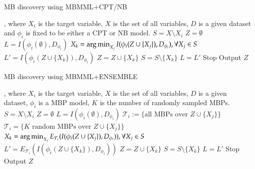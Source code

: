\begin{algorithm}[]
\caption{MB discovery using MBMML+CPT/NB}
\label{alg:mbmmlf}
\begin{algorithmic}[MBMML]
, where $X_i$ is the target variable, $X$ is the set of all variables, $D$ is a given dataset and $\phi_i$ is fixed to be either a CPT or  NB model.
    \State $S = X \setminus {X_i}$ 
    \State $Z = \emptyset$ 
    \State $L = I(\phi_i(\emptyset), D_{\phi_i})$  
    		\State $X_k = \operatorname*{arg\,min}_{X_j} I(\phi_i(Z \cup \{X_j\}), D_{\phi_i}), \forall X_j \in S$ 
    		\State $L' = I(\phi_i(Z \cup \{X_k\}), D_{\phi_i})$ 
    		 
    			\State $Z = Z \cup \{X_k\}$
    			\State $S = S \setminus \{X_k\}$
    			\State $L = L'$ 
    		\Else
    			\State Stop 
			\EndIf
	\EndWhile
	\State Output $Z$
\EndProcedure
\end{algorithmic}
\end{algorithm}

\begin{algorithm}[]
\caption{MB discovery using MBMML+ENSEMBLE}
\label{alg:mbmmlr}
\begin{algorithmic}[MBMML]
, where $X_i$ is the target variable, $X$ is the set of all variables, $D$ is a given dataset, $\phi_i$ is a MBP model, $K$ is the number of randomly sampled MBPs. 
    \State $S = X \setminus {X_i}$ 
    \State $Z = \emptyset$ 
    \State $L = I(\phi_i(\emptyset), D_{\phi_i})$  
    		 
    			\State $\mathcal{T}_i := \{\text{all MBPs over } Z \cup \{X_j\}\}$ 
    		\Else
    			\State $\mathcal{T}_i =  \{K \text{ random MBPs over } Z \cup \{X_j\}\}$ 
    		\EndIf 
    		\State $X_k = \operatorname*{arg\,min}_{X_j} E_{\mathcal{T}_i}(I(\phi_i(Z \cup \{X_j\}), D_{\phi_i})), \forall X_j \in S$ 
    		\State $L' = E_{\mathcal{T}_i}(I(\phi_i(Z \cup \{X_k\}), D_{\phi_i}))$ 
    		 
    			\State $Z = Z \cup \{X_k\}$
    			\State $S = S \setminus \{X_k\}$
    			\State $L = L'$ 
    		\Else
    			\State Stop 
			\EndIf
	\EndWhile
	\State Output $Z$
\EndProcedure
\end{algorithmic}
\end{algorithm}

